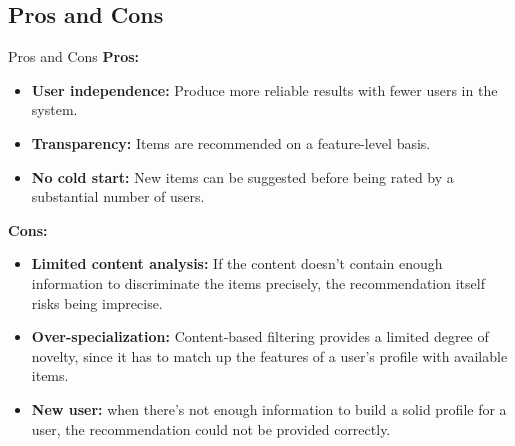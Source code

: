 \subsection{Pros and Cons}
\begin{frame}{Pros and Cons}
    \textbf{Pros:}
    \begin{itemize}
        \item  \textbf{User independence:} Produce more reliable results with fewer users in the system.
        \item \textbf{Transparency:} Items are recommended on a feature-level basis.
        \item \textbf{No cold start:} New items can be suggested before being rated by a substantial number of users.
    \end{itemize}
    \textbf{Cons:}
    \begin{itemize}
        \item \textbf{Limited content analysis:} If the content doesn’t contain enough information to discriminate the items precisely, the recommendation itself risks being imprecise.
        \item \textbf{Over-specialization:} Content-based filtering provides a limited degree of novelty, since it has to match up the features of a user’s profile with available items.
        \item \textbf{New user:} when there’s not enough information to build a solid profile for a user, the recommendation could not be provided correctly.
    \end{itemize}
\end{frame}